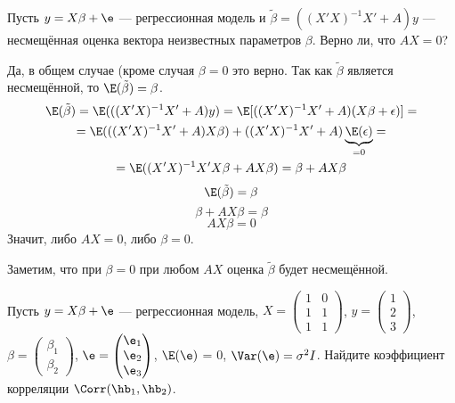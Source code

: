 \documentclass[pdftex,11pt,openany]{book}\usepackage[]{graphicx}\usepackage[]{color}
\begin{document}
\begin{problem} 
Пусть $y = X\beta + \e$ --- регрессионная модель и $\tilde{\beta} = ((X'X)^{-1}X'+ A)y$ --- несмещённая оценка вектора неизвестных параметров $\beta$. Верно ли, что $AX=0$?
\end{problem}

\begin{solution}
Да, в общем случае (кроме случая $\beta=0$ это верно. Так как $\tilde\beta$ является несмещённой, то $\E(\tilde\beta)=\beta$.
\begin{multline*}
\E(\tilde\beta)=\E(((X'X)^{-1}X'+A)y)=\E[((X'X)^{-1}X'+A)(X\beta+\epsilon)]=\\=
\E(((X'X)^{-1}X'+A)X\beta)+((X'X)^{-1}X'+A)\underbrace{\E(\epsilon)}_{=0}=\\
=\E((X'X)^{-1}X'X\beta+AX\beta)=\beta+AX\beta
\end{multline*}
\[\E(\tilde\beta)=\beta\]
\[\beta+AX\beta=\beta\]
\[AX\beta=0\]
Значит, либо $AX=0$, либо $\beta=0$.

Заметим, что при $\beta=0$ при любом $AX$ оценка $\tilde\beta$ будет несмещённой.
\end{solution}




\begin{problem}
 Пусть $y = X\beta + \e$ --- регрессионная модель, $X = \begin{pmatrix} 1 & 0 \\ 1 & 1 \\ 1 & 1 \end{pmatrix}$, $y = \begin{pmatrix} 1 \\ 2 \\ 3 \end{pmatrix}$, $\beta = \begin{pmatrix} \beta_1 \\ \beta_2 \end{pmatrix}$, $\e = \begin{pmatrix} \e_1 \\ \e_2 \\ \e_3 \end{pmatrix}$, $\E(\e)$ = 0, $\Var(\e) = \sigma^2 I$. Найдите коэффициент корреляции $\Corr(\hb_1,\hb_2)$.

\end{problem}
\end{document}

